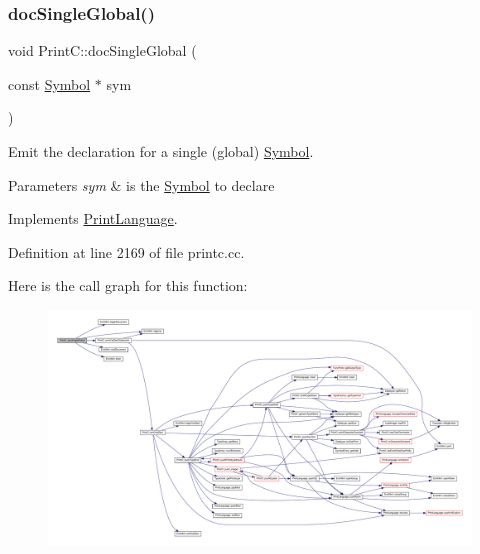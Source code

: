 \subsubsection{\texorpdfstring{docSingleGlobal()}{docSingleGlobal()}}
{\footnotesize\ttfamily void Print\+C\+::doc\+Single\+Global (\begin{DoxyParamCaption}\item[{const \mbox{\hyperlink{class_symbol}{Symbol}} $\ast$}]{sym }\end{DoxyParamCaption})\hspace{0.3cm}{\ttfamily [virtual]}}



Emit the declaration for a single (global) \mbox{\hyperlink{class_symbol}{Symbol}}. 


\begin{DoxyParams}{Parameters}
{\em sym} & is the \mbox{\hyperlink{class_symbol}{Symbol}} to declare \\
\hline
\end{DoxyParams}


Implements \mbox{\hyperlink{class_print_language_a2139aedceedf891b5702c0da1d905f08}{Print\+Language}}.



Definition at line 2169 of file printc.\+cc.

Here is the call graph for this function\+:
\nopagebreak
\begin{figure}[H]
\begin{center}
\leavevmode
\includegraphics[width=350pt]{class_print_c_a380029e0d567ee29b38225d6f6612b9c_cgraph}
\end{center}
\end{figure}
\mbox{\label{class_print_c_a6511933f0b8fd3f2fef8aa3920aa9de6}} 

